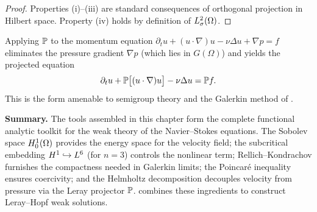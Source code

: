 \begin{proof}
  Properties (i)--(iii) are standard consequences of orthogonal projection in Hilbert
  space.  Property (iv) holds by definition of $L^{2}_\sigma(\Omega)$.
\end{proof}

\begin{remark}
  Applying $\mathbb{P}$ to the momentum equation
  $\partial_{t} u + (u \cdot \nabla) u - \nu \Delta u + \nabla p = f$ eliminates the
  pressure gradient $\nabla p$ (which lies in $G(\Omega)$) and yields the projected
  equation
  \begin{equation}\label{eq:projected-ns}
    \partial_{t} u + \mathbb{P}\bigl[(u \cdot \nabla) u\bigr] - \nu \Delta u = \mathbb{P} f.
  \end{equation}
  This is the form amenable to semigroup theory and the Galerkin method of
  .
\end{remark}

\bigskip

\noindent\textbf{Summary.}
The tools assembled in this chapter form the complete functional analytic toolkit for
the weak theory of the Navier--Stokes equations.
The Sobolev space $H^{1}_0(\Omega)$ provides the energy space for the velocity field;
the subcritical embedding $H^{1} \hookrightarrow L^{6}$ (for $n = 3$) controls the
nonlinear term; Rellich--Kondrachov furnishes the compactness needed in Galerkin limits;
the Poincar\'{e} inequality ensures coercivity; and the Helmholtz decomposition decouples
velocity from pressure via the Leray projector $\mathbb{P}$.
 combines these ingredients to construct Leray--Hopf weak
solutions.
